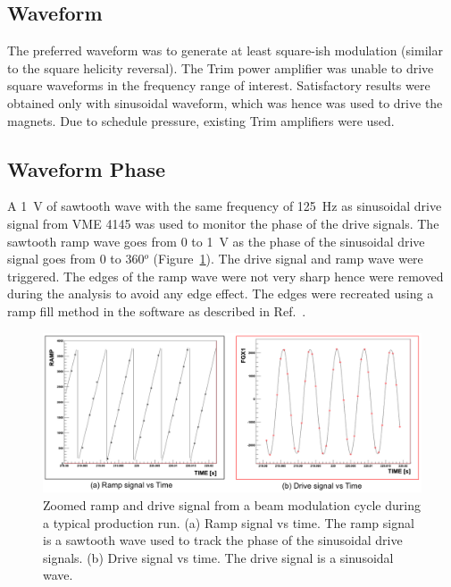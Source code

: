 \subsection{Waveform}
\label{Waveform}
The preferred waveform was to generate at least square-ish modulation (similar to the square helicity reversal). The Trim power amplifier was unable to drive square waveforms in the frequency range of interest. Satisfactory results were obtained only with sinusoidal waveform, which was hence was used to drive the magnets. Due to schedule pressure, existing Trim amplifiers were used.

\subsection{Waveform Phase}
\label{Waveform Phase}
A 1~V of sawtooth wave with the same frequency of 125~Hz as sinusoidal drive signal from VME 4145 was used to monitor the phase of the drive signals. The sawtooth ramp wave goes from 0 to 1~V as the phase of the sinusoidal drive signal goes from 0 to 360$^{o}$ (Figure~\ref{fig:BModSignalZoomed}). The drive signal and ramp wave were triggered. The edges of the ramp wave were not very sharp hence were removed during the analysis to avoid any edge effect. The edges were recreated using a ramp fill method in the software as described in Ref.~\cite{elog:don_analysis948}. 

\begin{singlespace}
\begin{figure}[!h]
	\begin{center}
	\includegraphics[width=15.0cm]{figures/BModSignalZoomed}
	\end{center}
	\caption
	{Zoomed ramp and drive signal from a beam modulation cycle during a typical production run. (a) Ramp signal vs time. The ramp signal is a sawtooth wave used to track the phase of the sinusoidal drive signals. (b) Drive signal vs time. The drive signal is a sinusoidal wave. }
	\label{fig:BModSignalZoomed}
\end{figure}
\end{singlespace}


